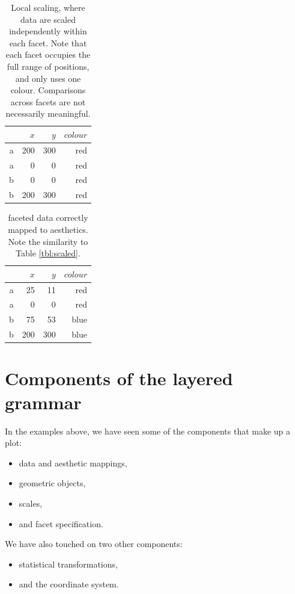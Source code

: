 \begin{table}[ht]
  \centering
  \begin{tabular}{r|r|r|r}
    & $x$ & $y$ & $colour$\\
    \hline
    a & 200 & 300 & red\\
    a & 0 & 0 & red\\
    \hline \hline
    b & 0 & 0 & red\\
    b & 200 & 300 & red
  \end{tabular}

  \caption{Local scaling, where data are scaled independently within each facet. Note that each facet occupies the full range of positions, and only uses one colour.  Comparisons across facets are not necessarily meaningful.}
  \label{tbl:complex-incorrect}
\end{table}

\begin{table}[ht]
  \centering
  \begin{tabular}{r|r|r|r}
    & $x$ & $y$ & $colour$\\
    \hline
    a & 25 & 11 & red\\
    a & 0 & 0 & red\\
    \hline \hline
    b & 75 & 53 & blue\\
    b & 200 & 300 & blue
  \end{tabular}

  \caption{faceted data correctly mapped to aesthetics.  Note the similarity to Table \ref{tbl:scaled}.}
  \label{tbl:complex-mapping}
\end{table}

\section{Components of the layered grammar}
\label{sec:components}

In the examples above, we have seen some of the components that make up a plot:

\begin{itemize}
  \item data and aesthetic mappings,
  \item geometric objects, 
  \item scales,
  \item and facet specification.
\end{itemize}

\noindent We have also touched on two other components: 

\begin{itemize}
  \item statistical transformations,
  \item and the coordinate system.
\end{itemize}

